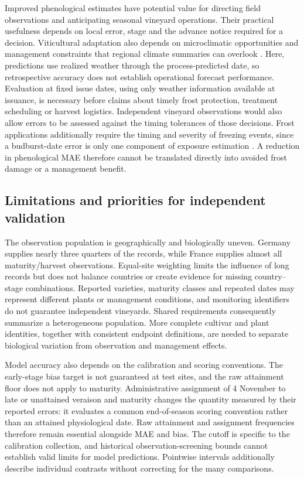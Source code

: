 \documentclass[a4paper,12pt]{article}
\let\OriginalSubsection\subsection
\renewcommand{\subsection}{\FloatBarrier\OriginalSubsection}
\begin{document}
Improved phenological estimates have potential value for directing field observations and anticipating seasonal vineyard operations. Their practical usefulness depends on local error, stage and the advance notice required for a decision. Viticultural adaptation also depends on microclimatic opportunities and management constraints that regional climate summaries can overlook \citep{mosedaleClimateChangeImpacts2016}. Here, predictions use realized weather through the process-predicted date, so retrospective accuracy does not establish operational forecast performance. Evaluation at fixed issue dates, using only weather information available at issuance, is necessary before claims about timely frost protection, treatment scheduling or harvest logistics. Independent vineyard observations would also allow errors to be assessed against the timing tolerances of those decisions. Frost applications additionally require the timing and severity of freezing events, since a budburst-date error is only one component of exposure estimation \citep{sgubinFrost2018}. A reduction in phenological MAE therefore cannot be translated directly into avoided frost damage or a management benefit.

\subsection{Limitations and priorities for independent validation}

The observation population is geographically and biologically uneven. Germany supplies nearly three quarters of the records, while France supplies almost all maturity/harvest observations. Equal-site weighting limits the influence of long records but does not balance countries or create evidence for missing country--stage combinations. Reported varieties, maturity classes and repeated dates may represent different plants or management conditions, and monitoring identifiers do not guarantee independent vineyards. Shared requirements consequently summarize a heterogeneous population. More complete cultivar and plant identities, together with consistent endpoint definitions, are needed to separate biological variation from observation and management effects.

Model accuracy also depends on the calibration and scoring conventions. The early-stage bias target is not guaranteed at test sites, and the raw attainment floor does not apply to maturity. Administrative assignment of 4 November to late or unattained veraison and maturity changes the quantity measured by their reported errors: it evaluates a common end-of-season scoring convention rather than an attained physiological date. Raw attainment and assignment frequencies therefore remain essential alongside MAE and bias. The cutoff is specific to the calibration collection, and historical observation-screening bounds cannot establish valid limits for model predictions. Pointwise intervals additionally describe individual contrasts without correcting for the many comparisons.
\end{document}
